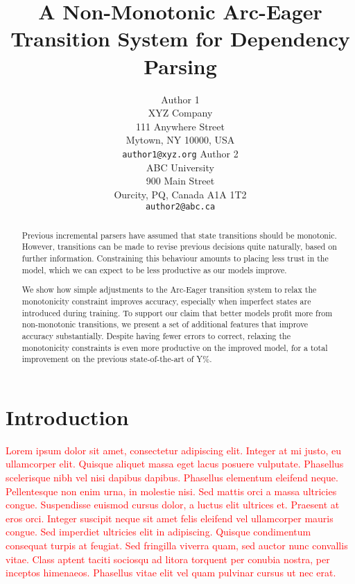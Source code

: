 \documentclass[11pt,letterpaper]{article}
\title{A Non-Monotonic Arc-Eager Transition System for Dependency Parsing}
\author{Author 1\\
	    XYZ Company\\
	    111 Anywhere Street\\
	    Mytown, NY 10000, USA\\
	    {\tt author1@xyz.org}
	  \And
	Author 2\\
  	ABC University\\
  	900 Main Street\\
  	Ourcity, PQ, Canada A1A 1T2\\
  {\tt author2@abc.ca}}
\date{}
\newcommand{\note}[1]{\textcolor{red}{#1}}
\begin{document}
\maketitle
\begin{abstract}
    Previous incremental parsers have assumed that state transitions
    should be monotonic. However, transitions can be made to revise
    previous decisions quite naturally, based on further information.
    Constraining this behaviour amounts
    to placing less trust in the model, which we can expect to be less productive as
    our models improve.

    We show how simple adjustments to the Arc-Eager transition system to relax the
    monotonicity constraint improves accuracy, especially when imperfect
    states are introduced during training. To support our claim that better models
    profit more from non-monotonic transitions, we present a set of
    additional features that improve accuracy substantially. Despite having fewer errors
    to correct, relaxing the monotonicity constraints is even more productive on
    the improved model, for a total improvement on the previous state-of-the-art of
    Y\%.



\end{abstract}

\section{Introduction}
\note{Lorem ipsum dolor sit amet, consectetur adipiscing elit. Integer at mi justo, eu ullamcorper elit. Quisque aliquet massa eget lacus posuere vulputate. Phasellus scelerisque nibh vel nisi dapibus dapibus. Phasellus elementum eleifend neque. Pellentesque non enim urna, in molestie nisi. Sed mattis orci a massa ultricies congue. Suspendisse euismod cursus dolor, a luctus elit ultrices et. Praesent at eros orci. Integer suscipit neque sit amet felis eleifend vel ullamcorper mauris congue. Sed imperdiet ultricies elit in adipiscing. Quisque condimentum consequat turpis at feugiat. Sed fringilla viverra quam, sed auctor nunc convallis vitae. Class aptent taciti sociosqu ad litora torquent per conubia nostra, per inceptos himenaeos. Phasellus vitae elit vel quam pulvinar cursus ut nec erat.}
\end{document}

